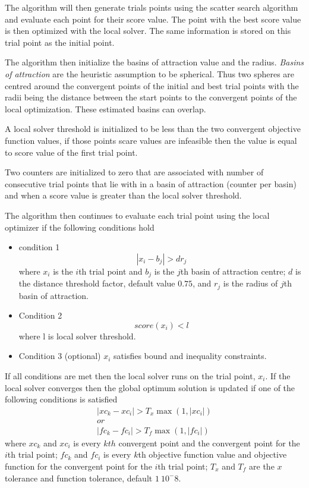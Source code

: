 The algorithm will then generate trials points using the scatter search algorithm and evaluate each point for their score value. The point with the best score value is then optimized with the local solver. The same information is stored on this trial point as the initial point. 

The algorithm then initialize the basins of attraction value and the radius. \textit{Basins of attraction} are the heuristic assumption to be spherical. Thus two spheres are centred around the convergent points of the initial and best trial points with the radii being the distance between the start points to the convergent points of the local optimization. These estimated basins can overlap. 

A local solver threshold is initialized to be less than the two convergent objective function values, if those points scare values are infeasible then the value is equal to score value of the first trial point. 

Two counters are initialized to zero that are associated with number of consecutive trial points that lie with in a basin of attraction (counter per basin) and when a score value is greater than the local solver threshold. 

The algorithm then continues to evaluate each trial point using the local optimizer if the following conditions hold


\begin{itemize}
\item condition 1
    \begin{equation}
        \label{eq:condition1}
        | x_i - b_j | > dr_j
    \end{equation}
        where $x_i$ is the $i$th trial point and $b_j$ is the $j$th basin of attraction centre; $d$ is the distance threshold factor, default value $0.75$, and $r_j$ is the radius of $j$th basin of attraction. 
    \item Condition 2 \[ score(x_i) < l\] where l is local solver threshold.
    \item Condition 3 (optional) $x_i$ satisfies bound and inequality constraints.
\end{itemize}
If all conditions are met then the local solver runs on the trial point, $x_i$. If the local solver converges then the global optimum solution is updated if one of the following conditions is satisfied
\begin{align}
    \label{eq:updateglobal}
    |xc_k - xc_i | > T_x \max ( 1,|xc_i| ) \\
    or \\
    |fc_k - fc_i | > T_f \max ( 1,|fc_i| )  
\end{align}
where $xc_k$ and $xc_i$ is every $kth$ convergent point and the convergent point for the $i$th trial point; $fc_k$ and $fc_i$ is every $k$th objective function value and objective function for the convergent point for the $i$th trial point; $T_x$ and $T_f$ are the $x$ tolerance and function tolerance, default $1\ 10^-8$. 

